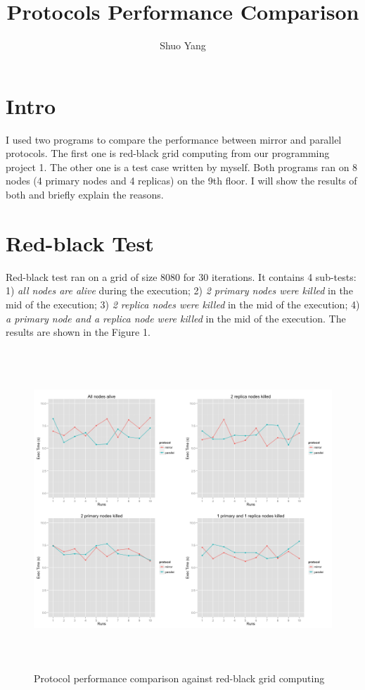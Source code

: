 \documentclass[11pt]{article}
\title{Protocols Performance Comparison}
\author{Shuo Yang}
\begin{document}
\maketitle

\section*{Intro}
I used two programs to compare the performance between mirror and
parallel protocols. The first one is red-black grid computing from
our programming project 1. The other one is a test case written by
myself. Both programs ran on 8 nodes (4 primary nodes and 4 replicas) on
the 9th floor. I will show the results of both and briefly explain the
reasons. 

\section*{Red-black Test}
Red-black test ran on a grid of size 8080 for 30 iterations. It
contains 4 sub-tests: 1) \emph{all nodes are alive} during the
execution; 2) \emph{2 primary nodes were killed} in the mid of the
execution; 3) \emph{2 replica nodes were killed} in the mid of the
execution; 4) \emph{a primary node and a replica node were killed} in
the mid of the execution. The results are shown in the Figure 1.

\begin{figure}
  \centering
  \includegraphics[width=16cm,height=12cm]{rb.png}
  \caption{Protocol performance comparison against red-black grid computing}
  \FloatBarrier
\end{figure}
\end{document}
